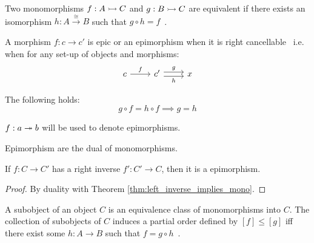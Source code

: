 \begin{definition}
  Two monomorphisms $f:A\rightarrowtail C$ and $g:B\rightarrowtail C$ are equivalent if there exists
  an isomorphism $h: A \overset{\cong}{\to} B$ such
  that $g\circ h=f$~\parencite[p.~11]{lane_moerdijk:sheaves_geometry_logic}.
\end{definition}

\begin{definition}
  A morphism $f:c\to c'$ is epic or an epimorphism when it is right
  cancellable~\parencite[p.~19]{lane:working_mathematician} i.e. when for any set-up of
  objects and morphisms:
  \[\begin{tikzcd}[ampersand replacement=\&]
    c \& {c'} \& x
    \arrow["h"', shift right=1, from=1-2, to=1-3]
    \arrow["f", from=1-1, to=1-2]
    \arrow["g", shift left=1, from=1-2, to=1-3]
  \end{tikzcd}\]

  The following holds:
  \[g \circ f = h \circ f \implies g = h\]
\end{definition}

\begin{remark}
  $f:a\twoheadrightarrow b$ will be used to denote epimorphisms.
\end{remark}

\begin{remark}
  Epimorphism are the dual of monomorphisms.
\end{remark}

\begin{theorem}\label{thm:right_inverse_implies_epi}
  If $f:C\to C'$ has a right inverse $f':C'\to C$, then it is a epimorphism.

  \begin{proof}
    By duality with Theorem \ref{thm:left_inverse_implies_mono}.
  \end{proof}
\end{theorem}

\begin{definition}[Subobject]
  A subobject of an object $C$ is an equivalence class of monomorphisms into
  $C$. The collection of subobjects of $C$ induces a partial order defined by
  $[f]\leq[g]$ iff there exist some $h: A\to B$ such that $f = g\circ
  h$~\parencite[p.~11]{lane_moerdijk:sheaves_geometry_logic}.
\end{definition}